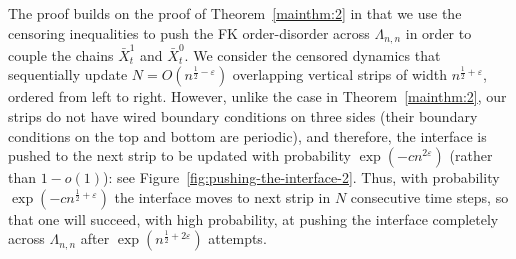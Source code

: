 \documentclass[reqno,11pt]{amsart}
\numberwithin{equation}{section}
\renewcommand{\epsilon}{\varepsilon}
\theoremstyle{definition}{
\newtheorem{example}[theorem]{Example}
\newtheorem{definition}[theorem]{Definition}
\newtheorem*{definition*}{Definition}
\newtheorem{problem}[theorem]{Problem}
\newtheorem{question}[theorem]{Question}
\newtheorem{remark}[theorem]{Remark}
}
\renewcommand{\epsilon}{\varepsilon}
\begin{document}
The proof builds on the proof of Theorem~\ref{mainthm:2} in that we use the censoring inequalities to push the FK order-disorder across $\Lambda_{n,n}$ in order to couple the chains $\bar X_t^1$ and $\bar X_t^0$. We consider the censored dynamics that sequentially update $N=O(n^{\frac 12-\epsilon})$ overlapping vertical strips of width $n^{\frac 12 +\epsilon}$, ordered from left to right. However, unlike the case in Theorem~\ref{mainthm:2}, our strips do not have wired boundary conditions on three sides (their boundary conditions on the top and bottom are periodic), and therefore, the interface is pushed to the next strip to be updated with probability $\exp({-cn^{2\epsilon}})$ (rather than $1-o(1)$): see Figure~\ref{fig:pushing-the-interface-2}. Thus, with probability $\exp({-cn^{\frac 12+\epsilon}})$  the interface moves to next strip in $N$ consecutive time steps, so that one will succeed, with high probability, at pushing the interface completely across $\Lambda_{n,n}$ after $\exp(n^{\frac 12+2\epsilon})$ attempts. 
\end{document}
